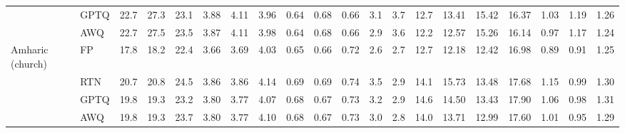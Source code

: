 \begin{landscape}
\begin{longtable}{llrrrrrrrrrrrrrrrrrr}
 & GPTQ & \cellcolor{loss!1}22.7 & \cellcolor{loss!1}27.3 & \cellcolor{loss!1}23.1 & \cellcolor{loss!4}3.88 & \cellcolor{loss!5}4.11 & \cellcolor{loss!3}3.96 & \cellcolor{loss!5}0.64 & \cellcolor{loss!5}0.68 & \cellcolor{loss!5}0.66 & \cellcolor{loss!0}3.1 & \cellcolor{loss!0}3.7 & \cellcolor{loss!1}12.7 & \cellcolor{loss!39}13.41 & \cellcolor{loss!15}15.42 & \cellcolor{loss!14}16.37 & \cellcolor{loss!42}1.03 & \cellcolor{loss!15}1.19 & \cellcolor{loss!15}1.26 \\
 & AWQ & \cellcolor{loss!1}22.7 & \cellcolor{loss!2}27.5 & \cellcolor{loss!1}23.5 & \cellcolor{loss!4}3.87 & \cellcolor{loss!6}4.11 & \cellcolor{loss!5}3.98 & \cellcolor{loss!5}0.64 & \cellcolor{loss!5}0.68 & \cellcolor{loss!5}0.66 & \cellcolor{loss!0}2.9 & \cellcolor{loss!0}3.6 & \cellcolor{loss!0}12.2 & \cellcolor{loss!25}12.57 & \cellcolor{loss!12}15.26 & \cellcolor{loss!11}16.14 & \cellcolor{loss!27}0.97 & \cellcolor{loss!12}1.17 & \cellcolor{loss!12}1.24 \\
\midrule
Amharic (church) & FP & 17.8 & 18.2 & 22.4 & 3.66 & 3.69 & 4.03 & 0.65 & 0.66 & 0.72 & 2.6 & 2.7 & 12.7 & 12.18 & 12.42 & 16.98 & 0.89 & 0.91 & 1.25 \\
 & RTN & \cellcolor{loss!3}20.7 & \cellcolor{loss!3}20.8 & \cellcolor{loss!2}24.5 & \cellcolor{loss!18}3.86 & \cellcolor{loss!15}3.86 & \cellcolor{loss!10}4.14 & \cellcolor{loss!20}0.69 & \cellcolor{loss!15}0.69 & \cellcolor{loss!10}0.74 & \cellcolor{loss!0}3.5 & \cellcolor{loss!0}2.9 & \cellcolor{loss!0}14.1 & \cellcolor{loss!60}15.73 & \cellcolor{loss!18}13.48 & \cellcolor{loss!12}17.68 & \cellcolor{loss!60}1.15 & \cellcolor{loss!18}0.99 & \cellcolor{loss!12}1.30 \\
 & GPTQ & \cellcolor{loss!2}19.8 & \cellcolor{loss!1}19.3 & \cellcolor{loss!1}23.2 & \cellcolor{loss!12}3.80 & \cellcolor{loss!7}3.77 & \cellcolor{loss!4}4.07 & \cellcolor{loss!15}0.68 & \cellcolor{loss!6}0.67 & \cellcolor{loss!3}0.73 & \cellcolor{loss!0}3.2 & \cellcolor{loss!0}2.9 & \cellcolor{loss!1}14.6 & \cellcolor{loss!39}14.50 & \cellcolor{loss!17}13.43 & \cellcolor{loss!15}17.90 & \cellcolor{loss!40}1.06 & \cellcolor{loss!17}0.98 & \cellcolor{loss!15}1.31 \\
 & AWQ & \cellcolor{loss!2}19.8 & \cellcolor{loss!1}19.3 & \cellcolor{loss!1}23.7 & \cellcolor{loss!13}3.80 & \cellcolor{loss!7}3.77 & \cellcolor{loss!6}4.10 & \cellcolor{loss!15}0.68 & \cellcolor{loss!5}0.67 & \cellcolor{loss!5}0.73 & \cellcolor{loss!0}3.0 & \cellcolor{loss!0}2.8 & \cellcolor{loss!0}14.0 & \cellcolor{loss!26}13.71 & \cellcolor{loss!10}12.99 & \cellcolor{loss!11}17.60 & \cellcolor{loss!27}1.01 & \cellcolor{loss!10}0.95 & \cellcolor{loss!10}1.29 \\

\end{longtable}
\end{landscape}
